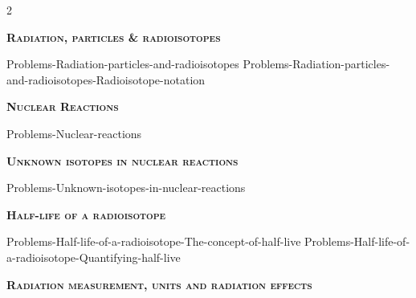 \documentclass[main.tex]{subfiles}
\begin{document}
\newcommand\chapterlabel{Ch-nuclear}
\newpage
{}
\fancyhfoffset[E,O]{0pt}
\setlength{\columnsep}{30pt}
\begin{conclusion}
\iftoggle{chem121}{}{\setcounter{chapter}{9}}
\iftoggle{chem121}{\setcounter{chapter}{4}}{}
\end{conclusion}
\begin{multicols*}{2}\setcounter{numA}{1}  %






{\raggedright\textsc{\textbf{Radiation, particles \& radioisotopes }}\par}

{Problems-Radiation-particles-and-radioisotopes}
{Problems-Radiation-particles-and-radioisotopes-Radioisotope-notation}







{\raggedright\textsc{\textbf{Nuclear Reactions }}\par}

{Problems-Nuclear-reactions}

  

 {\raggedright\textsc{\textbf{Unknown isotopes in nuclear reactions }}\par}



{Problems-Unknown-isotopes-in-nuclear-reactions}





{\raggedright\textsc{\textbf{Half-life of a radioisotope }}\par}
{Problems-Half-life-of-a-radioisotope-The-concept-of-half-live}
{Problems-Half-life-of-a-radioisotope-Quantifying-half-live}

 
{\raggedright\textsc{\textbf{ Radiation measurement, units and radiation effects }}\par}


\end{multicols*}
\end{document}

